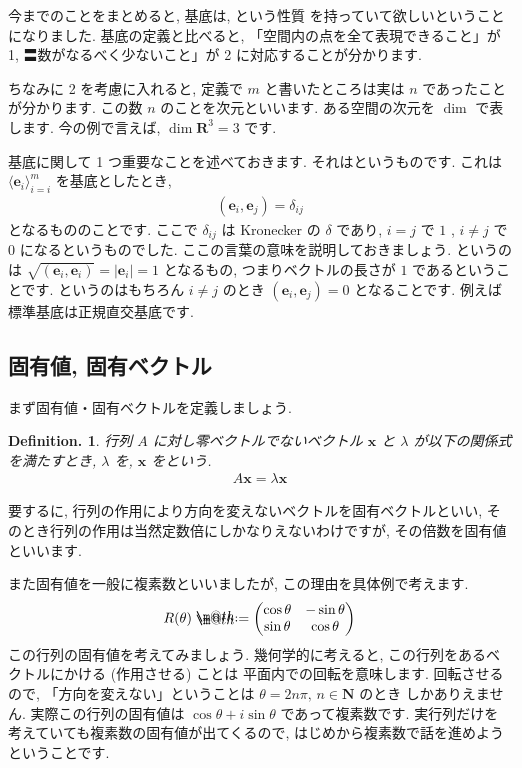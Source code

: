 \documentclass[openany, a4paper, oneside]{jsbook}
\makeatletter
\newcommand*{\defeq}{\mathrel{\rlap{%
\raisebox{0.3ex}{$\m@th\cdot$}}%
\raisebox{-0.3ex}{$\m@th\cdot$}}%
=}
\theoremstyle{break}
\theoremstyle{breakdefn}
\newtheorem{defn}[thm]{Definition.}
\makeatother
\begin{document}
今までのことをまとめると, 基底は, という性質
を持っていて欲しいということになりました. 基底の定義と比べると, 「空間内の点を全て表現できること」が 1,
〓数がなるべく少ないこと」が 2 に対応することが分かります.

ちなみに 2 を考慮に入れると, 定義で $m$ と書いたところは実は $n$ であったことが分かります.
この数 $n$ のことを次元といいます.
ある空間の次元を $\dim$ で表します. 今の例で言えば,  $\dim \bm{R}^3 =3$ です.

基底に関して 1 つ重要なことを述べておきます. それはというものです.
これは $\langle \bm{e}_{i} \rangle_{i=i}^m$ を基底としたとき,
    \begin{align}
        (\bm{e}_{i},\bm{e}_{j}) = \delta _{ij}
    \end{align}
となるもののことです. ここで $\delta _{ij}$ は Kronecker の $\delta$ であり,  $i=j$ で $1$ ,  $i \not = j$ で $0$ になるというものでした.
ここの言葉の意味を説明しておきましょう. というのは $\sqrt{(\bm{e}_{i},\bm{e}_{i})}=\mid \bm{e}_{i} \mid = 1$
となるもの, つまりベクトルの長さが $1$ であるということです. というのはもちろん $i\not = j$ のとき
 $(\bm{e}_{i},\bm{e}_{j})=0$ となることです. 例えば標準基底は正規直交基底です.
\subsection{固有値, 固有ベクトル \label{eigen}}


まず固有値・固有ベクトルを定義しましょう.
    \begin{defn}行列 $A$ に対し零ベクトルでないベクトル $\bm{x}$ と $\lambda $
が以下の関係式を満たすとき,  $\lambda$ を,
 $\bm{x}$ をという.
    \begin{align}
        A \bm{x} = \lambda \bm{x}
    \end{align}
    \end{defn}
要するに, 行列の作用により方向を変えないベクトルを固有ベクトルといい,
そのとき行列の作用は当然定数倍にしかなりえないわけですが, その倍数を固有値といいます.

また固有値を一般に複素数といいましたが, この理由を具体例で考えます.
    \begin{align}
        R (\theta ) \defeq      \begin{pmatrix} \cos \theta & - \sin \theta \\
                        \sin \theta & \cos \theta
        \end{pmatrix}
    \end{align}
この行列の固有値を考えてみましょう. 幾何学的に考えると, この行列をあるベクトルにかける (作用させる) ことは
平面内での回転を意味します. 回転させるので, 「方向を変えない」ということは $\theta = 2n \pi , \, n \in \bm{N}$ のとき
しかありえません. 実際この行列の固有値は $\cos \theta + i \sin \theta$ であって複素数です.
実行列だけを考えていても複素数の固有値が出てくるので, はじめから複素数で話を進めようということです.
\end{document}
